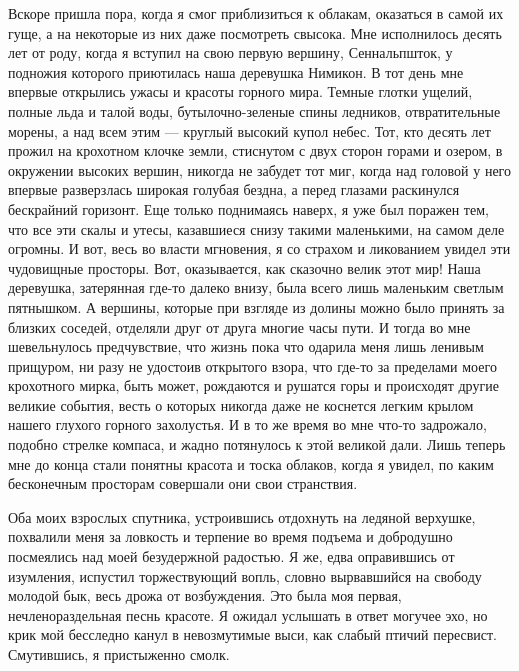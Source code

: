 Вскоре пришла пора,  когда я смог приблизиться к  облакам, оказаться в
самой  их  гуще,  а  на  некоторые из  них  даже  посмотреть  свысока.
Мне  исполнилось  десять  лет  от   роду,  когда  я  вступил  на  свою
первую  вершину, Сеннальпшток,  у  подножия  которого приютилась  наша
деревушка Нимикон.  В тот день  мне впервые открылись ужасы  и красоты
горного  мира.  Темные  глотки  ущелий,  полные  льда  и  талой  воды,
бутылочно-зеленые спины  ледников, отвратительные  морены, а  над всем
этим ---  круглый высокий купол небес.  Тот, кто десять лет  прожил на
крохотном клочке  земли, стиснутом  с двух сторон  горами и  озером, в
окружении  высоких  вершин, никогда  не  забудет  тот миг,  когда  над
головой у  него впервые  разверзлась широкая  голубая бездна,  а перед
глазами раскинулся бескрайний горизонт.  Еще только поднимаясь наверх,
я уже  был поражен тем,  что все эти  скалы и утесы,  казавшиеся снизу
такими  маленькими, на  самом  деле  огромны. И  вот,  весь во  власти
мгновения, я со  страхом и ликованием увидел  эти чудовищные просторы.
Вот,  оказывается,  как  сказочно  велик  этот  мир!  Наша  деревушка,
затерянная  где-то далеко  внизу,  была всего  лишь маленьким  светлым
пятнышком. А вершины, которые при взгляде из долины можно было принять
за близких соседей,  отделяли друг от друга многие часы  пути. И тогда
во мне шевельнулось предчувствие, что жизнь пока что одарила меня лишь
ленивым прищуром, ни  разу не удостоив открытого взора,  что где-то за
пределами моего крохотного мирка, быть может, рождаются и рушатся горы
и происходят другие  великие события, весть о которых  никогда даже не
коснется легким  крылом нашего глухого  горного захолустья. И в  то же
время  во  мне что-то  задрожало,  подобно  стрелке компаса,  и  жадно
потянулось к этой великой дали. Лишь теперь мне до конца стали понятны
красота  и  тоска  облаков,  когда  я  увидел,  по  каким  бесконечным
просторам совершали они свои странствия.

Оба моих взрослых спутника, устроившись отдохнуть на ледяной верхушке,
похвалили меня  за ловкость и  терпение во время подъема  и добродушно
посмеялись  над  моей безудержной  радостью.  Я  же, едва  оправившись
от  изумления, испустил  торжествующий  вопль,  словно вырвавшийся  на
свободу молодой бык,  весь дрожа от возбуждения. Это  была моя первая,
нечленораздельная  песнь красоте.  Я ожидал  услышать в  ответ могучее
эхо,  но крик  мой бесследно  канул  в невозмутимые  выси, как  слабый
птичий пересвист. Смутившись, я пристыженно смолк.

